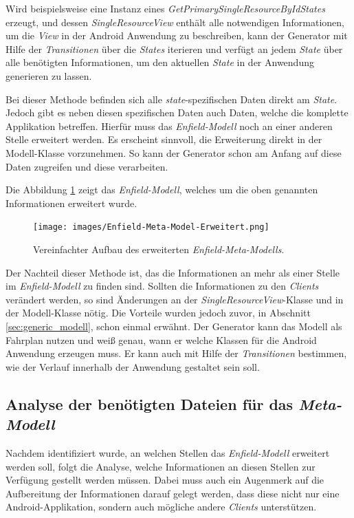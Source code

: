 Wird beispielsweise eine Instanz eines \textit{GetPrimarySingleResourceByIdStates} erzeugt, und dessen \textit{SingleResourceView} enthält alle notwendigen Informationen, um die \textit{View} in der Android Anwendung zu beschreiben, kann der Generator mit Hilfe der \textit{Transitionen} über die \textit{States} iterieren und verfügt an jedem \textit{State} über alle benötigten Informationen, um den aktuellen \textit{State} in der Anwendung generieren zu lassen.

Bei dieser Methode befinden sich alle \textit{state}-spezifischen Daten direkt am \textit{State}. Jedoch gibt es neben diesen spezifischen Daten auch Daten, welche die komplette Applikation betreffen. Hierfür muss das \textit{Enfield-Modell} noch an einer anderen Stelle erweitert werden. 
Es erscheint sinnvoll, die Erweiterung direkt in der Modell-Klasse vorzunehmen. So kann der Generator schon am Anfang auf diese Daten zugreifen und diese verarbeiten.

Die Abbildung \ref{fig:enfield-model-extended} zeigt das \textit{Enfield-Modell}, welches um die oben genannten Informationen erweitert wurde.

\begin{figure}[H]
	\begin{center}
		\texttt{[image: images/Enfield-Meta-Model-Erweitert.png]}
		\caption{Vereinfachter Aufbau des erweiterten \textit{Enfield-Meta-Modells}.}
		\label{fig:enfield-model-extended}
	\end{center}
\end{figure}

Der Nachteil dieser Methode ist, das die Informationen an mehr als einer Stelle im \textit{Enfield-Modell} zu finden sind. Sollten die Informationen zu den \textit{Clients} verändert werden, so sind Änderungen an der \textit{SingleResourceView}-Klasse und in der Modell-Klasse nötig. Die Vorteile wurden jedoch zuvor, in Abschnitt \ref{sec:generic_modell}, schon einmal erwähnt. Der Generator kann das Modell als Fahrplan nutzen und weiß genau, wann er welche Klassen für die Android Anwendung erzeugen muss. Er kann auch mit Hilfe der \textit{Transitionen} bestimmen, wie der Verlauf innerhalb der Anwendung gestaltet sein soll.

\subsection{Analyse der benötigten Dateien für das \textit{Meta-Modell}}

Nachdem identifiziert wurde, an welchen Stellen das \textit{Enfield-Modell} erweitert werden soll, folgt die Analyse, welche Informationen an diesen Stellen zur Verfügung gestellt werden müssen. Dabei muss auch ein Augenmerk auf die Aufbereitung der Informationen darauf gelegt werden, dass diese nicht nur eine Android-Applikation, sondern auch mögliche andere \textit{Clients} unterstützen.

